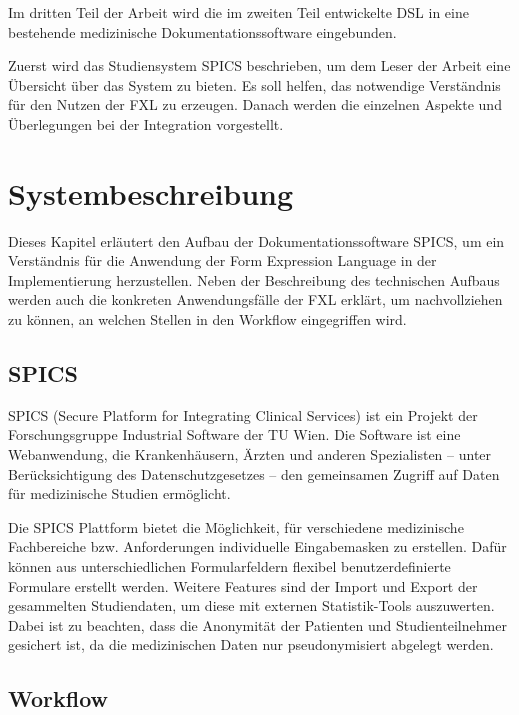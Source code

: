 Im dritten Teil der Arbeit wird die im zweiten Teil entwickelte DSL in eine bestehende medizinische Dokumentationssoftware eingebunden.

Zuerst wird das Studiensystem SPICS beschrieben, um dem Leser der Arbeit eine Übersicht über das System zu bieten. Es soll helfen, das notwendige Verständnis für den Nutzen der FXL zu erzeugen. Danach werden die einzelnen Aspekte und Überlegungen bei der Integration vorgestellt.

\chapter{Systembeschreibung}
\label{chapter_systembeschreibung}

Dieses Kapitel erläutert den Aufbau der Dokumentationssoftware SPICS, um ein Verständnis für die Anwendung der Form Expression Language in der Implementierung herzustellen. Neben der Beschreibung des technischen Aufbaus werden auch die konkreten Anwendungsfälle der FXL erklärt, um nachvollziehen zu können, an welchen Stellen in den Workflow eingegriffen wird.


\section{SPICS}

SPICS (Secure Platform for Integrating Clinical Services) ist ein Projekt der  Forschungsgruppe Industrial Software der TU Wien. Die Software ist eine Webanwendung, die Krankenhäusern, Ärzten und anderen Spezialisten -- unter Berücksichtigung des Datenschutzgesetzes -- den gemeinsamen Zugriff auf Daten für medizinische Studien ermöglicht. 

Die SPICS Plattform bietet die Möglichkeit, für verschiedene medizinische Fachbereiche bzw. Anforderungen individuelle Eingabemasken zu erstellen. Dafür können aus unterschiedlichen Formularfeldern flexibel benutzerdefinierte Formulare erstellt werden. Weitere Features sind der Import und Export der gesammelten Studiendaten, um diese mit externen Statistik-Tools auszuwerten. Dabei ist zu beachten, dass die Anonymität der Patienten und Studienteilnehmer gesichert ist, da die medizinischen Daten nur pseudonymisiert abgelegt werden.


\section{Workflow}
\label{section_systembeschreibung_workflow}

